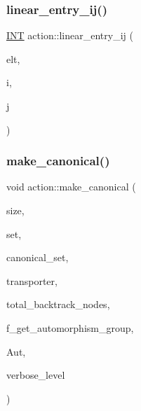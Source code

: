 \subsubsection{\texorpdfstring{linear\+\_\+entry\+\_\+ij()}{linear\_entry\_ij()}}
{\footnotesize\ttfamily \mbox{\hyperlink{galois_8h_a09fddde158a3a20bd2dcadb609de11dc}{I\+NT}} action\+::linear\+\_\+entry\+\_\+ij (\begin{DoxyParamCaption}\item[{void $\ast$}]{elt,  }\item[{\mbox{\hyperlink{galois_8h_a09fddde158a3a20bd2dcadb609de11dc}{I\+NT}}}]{i,  }\item[{\mbox{\hyperlink{galois_8h_a09fddde158a3a20bd2dcadb609de11dc}{I\+NT}}}]{j }\end{DoxyParamCaption})}

\mbox{\label{classaction_ae20ff0b8d092d2eddf9b661fb8821fd2}} 
\subsubsection{\texorpdfstring{make\+\_\+canonical()}{make\_canonical()}}
{\footnotesize\ttfamily void action\+::make\+\_\+canonical (\begin{DoxyParamCaption}\item[{\mbox{\hyperlink{galois_8h_a09fddde158a3a20bd2dcadb609de11dc}{I\+NT}}}]{size,  }\item[{\mbox{\hyperlink{galois_8h_a09fddde158a3a20bd2dcadb609de11dc}{I\+NT}} $\ast$}]{set,  }\item[{\mbox{\hyperlink{galois_8h_a09fddde158a3a20bd2dcadb609de11dc}{I\+NT}} $\ast$}]{canonical\+\_\+set,  }\item[{\mbox{\hyperlink{galois_8h_a09fddde158a3a20bd2dcadb609de11dc}{I\+NT}} $\ast$}]{transporter,  }\item[{\mbox{\hyperlink{galois_8h_a09fddde158a3a20bd2dcadb609de11dc}{I\+NT}} \&}]{total\+\_\+backtrack\+\_\+nodes,  }\item[{\mbox{\hyperlink{galois_8h_a09fddde158a3a20bd2dcadb609de11dc}{I\+NT}}}]{f\+\_\+get\+\_\+automorphism\+\_\+group,  }\item[{\mbox{\hyperlink{classsims}{sims}} $\ast$}]{Aut,  }\item[{\mbox{\hyperlink{galois_8h_a09fddde158a3a20bd2dcadb609de11dc}{I\+NT}}}]{verbose\+\_\+level }\end{DoxyParamCaption})}

